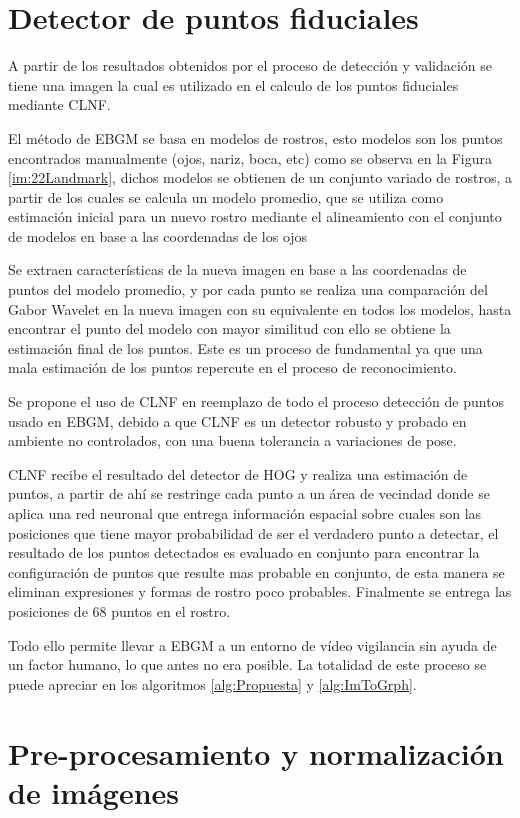 \section{Detector de puntos fiduciales}
A partir de los resultados obtenidos por el proceso de detección y validación se tiene una imagen la cual es utilizado en el calculo de los puntos fiduciales mediante \acf{CLNF}.

El método de \ac{EBGM} se basa en modelos de rostros, esto modelos son los puntos encontrados manualmente (ojos, nariz, boca, etc) como se observa en la Figura \ref{im:22Landmark}, dichos modelos se obtienen de un conjunto variado de rostros, a partir de los cuales se calcula un modelo promedio, que se utiliza como estimación inicial para un nuevo rostro mediante el alineamiento con el conjunto de modelos en base a las coordenadas de los ojos 

Se extraen características de la nueva imagen en base a las coordenadas de puntos del modelo promedio, y por cada punto se realiza una comparación del Gabor Wavelet en la nueva imagen con su equivalente en todos los modelos, hasta encontrar el punto del modelo con mayor similitud con ello se obtiene la estimación final de los puntos. Este es un proceso de fundamental ya que una mala estimación de los puntos repercute en el proceso de reconocimiento.

Se propone el uso de \acf{CLNF} en reemplazo de todo el proceso detección de puntos usado en \ac{EBGM}, debido a que \ac{CLNF} es un detector robusto y probado en ambiente no controlados, con una buena tolerancia a variaciones de pose.

\ac{CLNF} recibe el resultado del detector de \ac{HOG} y realiza una estimación de puntos, a partir de ahí se restringe cada punto a un área de vecindad donde se aplica una red neuronal que entrega información espacial sobre cuales son las posiciones que tiene mayor probabilidad de ser el verdadero punto a detectar, el resultado de los puntos detectados es evaluado en conjunto para encontrar la configuración de puntos que resulte mas probable en conjunto, de esta manera se eliminan expresiones y formas de rostro poco probables. Finalmente se entrega las posiciones de 68 puntos en el rostro.

Todo ello permite llevar a \ac{EBGM} a un entorno de vídeo vigilancia sin ayuda de un factor humano, lo que antes no era posible. La totalidad de este proceso se puede apreciar en los algoritmos \ref{alg:Propuesta} y \ref{alg:ImToGrph}.

\section{Pre-procesamiento y normalización de imágenes}\label{scc:PropIluminacion}

